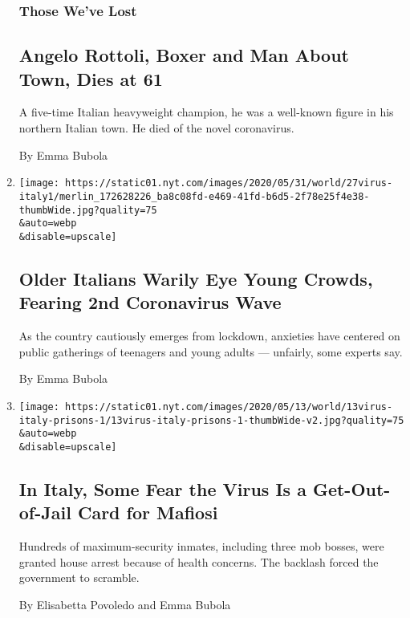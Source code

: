 \begin{enumerate}
  \hypertarget{those-weve-lost-1}{%
  \subsubsection{Those We've Lost}\label{those-weve-lost-1}}

  \hypertarget{angelo-rottoli-boxer-and-man-about-town-dies-at-61}{%
  \subsection{Angelo Rottoli, Boxer and Man About Town, Dies at
  61}\label{angelo-rottoli-boxer-and-man-about-town-dies-at-61}}

  A five-time Italian heavyweight champion, he was a well-known figure
  in his northern Italian town. He died of the novel coronavirus.

  By Emma Bubola
\item
  \href{/2020/05/29/world/europe/italy-young-people-coronavirus.html}{}

  \texttt{[image: https://static01.nyt.com/images/2020/05/31/world/27virus-italy1/merlin\_172628226\_ba8c08fd-e469-41fd-b6d5-2f78e25f4e38-thumbWide.jpg?quality=75\\\&auto=webp\\\&disable=upscale]}

  \hypertarget{older-italians-warily-eye-young-crowds-fearing-2nd-coronavirus-wave}{%
  \subsection{Older Italians Warily Eye Young Crowds, Fearing 2nd
  Coronavirus
  Wave}\label{older-italians-warily-eye-young-crowds-fearing-2nd-coronavirus-wave}}

  As the country cautiously emerges from lockdown, anxieties have
  centered on public gatherings of teenagers and young adults ---
  unfairly, some experts say.

  By Emma Bubola
\item
  \href{/2020/05/13/world/europe/coronavirus-italy-mafia.html}{}

  \texttt{[image: https://static01.nyt.com/images/2020/05/13/world/13virus-italy-prisons-1/13virus-italy-prisons-1-thumbWide-v2.jpg?quality=75\\\&auto=webp\\\&disable=upscale]}

  \hypertarget{in-italy-some-fear-the-virus-is-a-get-out-of-jail-card-for-mafiosi}{%
  \subsection{In Italy, Some Fear the Virus Is a Get-Out-of-Jail Card
  for
  Mafiosi}\label{in-italy-some-fear-the-virus-is-a-get-out-of-jail-card-for-mafiosi}}

  Hundreds of maximum-security inmates, including three mob bosses, were
  granted house arrest because of health concerns. The backlash forced
  the government to scramble.

  By Elisabetta Povoledo and Emma Bubola
\end{enumerate}

